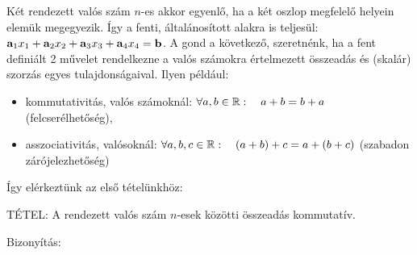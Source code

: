 \documentclass[a4paper,11.5pt]{article}
\begin{document}
	\noindent Két rendezett valós szám $n$-es akkor egyenlő, ha a két oszlop megfelelő helyein elemük megegyezik. Így a fenti, általánosított alakra is teljesül: $\textbf{a}_1x_1+\textbf{a}_2x_2+\textbf{a}_3x_3+\textbf{a}_4x_4=\textbf{b}$. A gond a következő, szeretnénk, ha a fent definiált 2 művelet rendelkezne a valós számokra értelmezett összeadás és (skalár) szorzás egyes tulajdonságaival. Ilyen például:
	\begin{itemize}
		\item kommutativitás, valós számoknál: $\forall a,b \in \mathbb{R}: \quad a+b=b+a$ (felcserélhetőség),
		\item asszociativitás, valósoknál: $\forall a,b,c \in \mathbb{R}: \quad (a+b)+c=a+(b+c)$ (szabadon zárójelezhetőség)
	\end{itemize}
	
	\noindent Így elérkeztünk az első tételünkhöz:
	
	 TÉTEL: A rendezett valós szám $n$-esek közötti összeadás kommutatív.
	
	\noindent Bizonyítás:
	
\end{document}

